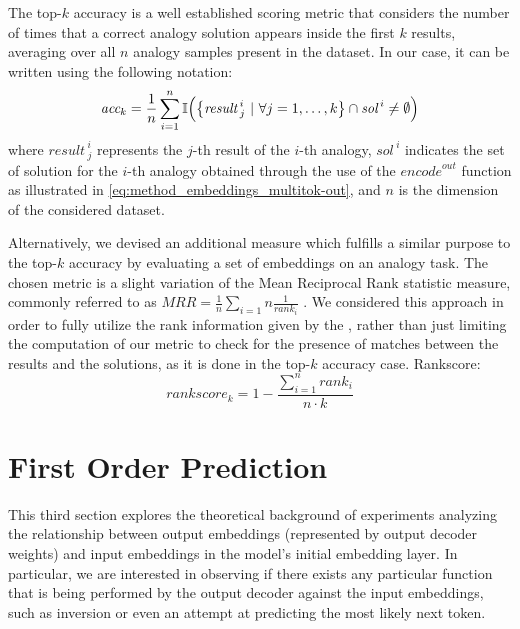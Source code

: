 The top-$k$ accuracy is a well established scoring metric that considers the number of times that a correct analogy solution appears inside the first $k$ results, averaging over all $n$ analogy samples present in the dataset.
In our case, it can be written using the following notation:
\begin{equation}
    \label{eq:method_embeddings_topk-accuracy}
    \textit{acc}_k = \frac{1}{n} \sum_{i=1}^{n} \mathbb{I}\Bigl( {\left\{ {\textit{result}\,}^i_j \ |\ \forall j = 1,\ldots,k \right\}} \cap {\textit{sol}\,}^i \neq \emptyset \Bigr)
\end{equation}
where ${\textit{result}\,}^i_j$ represents the $j$-th result of the $i$-th analogy, ${\textit{sol}\,}^i$ indicates the set of solution for the $i$-th analogy obtained through the use of the ${\textit{encode}}^{out}$ function as illustrated in \cref{eq:method_embeddings_multitok-out}, and $n$ is the dimension of the considered dataset.

Alternatively, we devised an additional measure which fulfills a similar purpose to the top-$k$ accuracy by evaluating a set of embeddings on an analogy task.
The chosen metric is a slight variation of the Mean Reciprocal Rank statistic measure, commonly referred to as $MRR = \frac{1}{n}\sum_{i=1}{n}{\frac{1}{rank_i}}$ .
We considered this approach in order to fully utilize the rank information given by the , rather than just limiting the computation of our metric to check for the presence of matches between the results and the solutions, as it is done in the top-$k$ accuracy case.
Rankscore:
\begin{equation}
    \label{eq:method_embeddings_rankscore}
    \textit{rankscore}_k = 1 - \frac{\sum_{i=1}^{n}{rank_i}}{n \cdot k}
\end{equation}


\section{First Order Prediction}\label{sec:method_fom}

This third section explores the theoretical background of experiments analyzing the relationship between output embeddings (represented by output decoder weights) and input embeddings in the model's initial embedding layer.
In particular, we are interested in observing if there exists any particular function that is being performed by the output decoder against the input embeddings, such as inversion or even an attempt at predicting the most likely next token.

